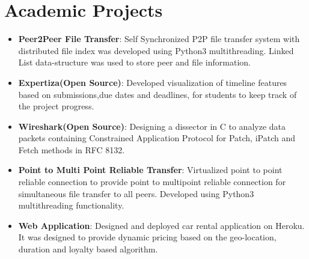 \documentclass[letterpaper,11pt]{article}
\newcommand{\resumeItem}[2]{
  \item\small{
    \textbf{#1}{: #2 \vspace{-2pt}}
  }
}
\newcommand{\resumeSubItem}[2]{\resumeItem{#1}{#2}\vspace{-4pt}}
\newcommand{\resumeSubHeadingListStart}{\begin{itemize}[leftmargin=*]}
\newcommand{\resumeSubHeadingListEnd}{\end{itemize}}
\begin{document}
\section{Academic Projects}
  \resumeSubHeadingListStart
    \resumeSubItem{Peer2Peer File Transfer}
      {Self Synchronized P2P file transfer system with distributed file index was developed using Python3 multithreading. Linked List data-structure was used to store peer and file information.}
    \resumeSubItem{Expertiza(Open Source)}
      {Developed visualization of timeline features based on submissions,due dates and deadlines, for students to keep track of the project progress.} %
    \resumeSubItem{Wireshark(Open Source)}
      {Designing a dissector in C to analyze data packets containing Constrained Application Protocol for Patch, iPatch and Fetch methods in RFC 8132.}
    \resumeSubItem{Point to Multi Point Reliable Transfer}
      {Virtualized point to point reliable connection to provide point to multipoint reliable connection for simultaneous file transfer to all peers. Developed using Python3 multithreading functionality.}
    \resumeSubItem{Web Application}
      {Designed and deployed car rental application on Heroku. It was designed to provide dynamic pricing based on the geo-location, duration and loyalty based algorithm.}
  \resumeSubHeadingListEnd


\end{document}
